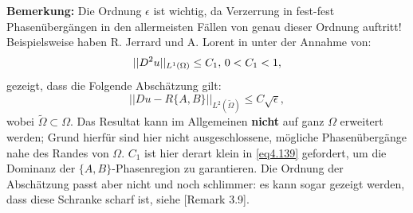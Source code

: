 \textbf{Bemerkung:} Die Ordnung \(\epsilon\) ist wichtig, da Verzerrung in fest-fest Phasenübergängen in den allermeisten Fällen von genau dieser Ordnung auftritt! Beispielsweise haben R. Jerrard und A. Lorent in \cite{jerrard2013multiwell} unter der Annahme von:
\begin{equation}{\label{eq4.139}}
    ||D^2 u||_{L^1(\Omega)} \leq C_1, \, 0 < C_1 < 1,
\end{equation}
gezeigt, dass die Folgende Abschätzung gilt:
\begin{equation}
    ||Du - R\{A,B\}||_{L^2(\tilde{\Omega})} \leq C \sqrt{\epsilon},
\end{equation}
wobei \(\tilde{\Omega} \subset \Omega\). Das Resultat kann im Allgemeinen \textbf{nicht} auf ganz \(\Omega\) erweitert werden; Grund hierfür sind hier nicht ausgeschlossene, mögliche Phasenübergänge nahe des Randes von \(\Omega\). \(C_1\) ist hier derart klein in \eqref{eq4.139} gefordert, um die Dominanz der \(\{A,B\}\)-Phasenregion zu garantieren. Die Ordnung der Abschätzung passt aber nicht und noch schlimmer: es kann sogar gezeigt werden, dass diese Schranke scharf ist, siehe \cite{davoli2020two}[Remark 3.9].

